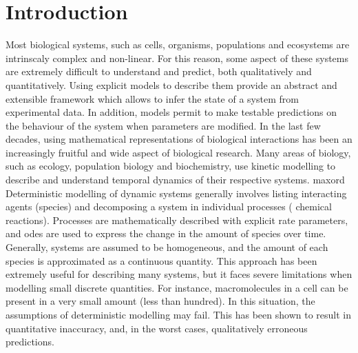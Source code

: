 \section{Introduction} \label{intro}

Most biological systems, such as cells, organisms, populations and ecosystems are intrinscaly complex and non-linear.
For this reason, some aspect of these systems are extremely difficult to understand and predict, both qualitatively and quantitatively\cite{klipp_systems_2013}.
Using explicit models to describe them provide an abstract and extensible framework which allows to infer the state of a system from experimental data.
In addition, models permit to make testable predictions on the behaviour of the system when parameters are modified.
In the last few decades, using mathematical representations of biological interactions has been an increasingly fruitful and wide aspect of biological research.
Many areas of biology, such as ecology, population biology and biochemistry,
use kinetic modelling to describe and understand temporal dynamics of their respective systems.
\gls{maxord}
Deterministic modelling of dynamic systems generally involves listing
interacting agents (species) and decomposing a system in individual processes (\eg{} chemical reactions).
Processes are mathematically described with explicit rate parameters, and \glspl{ode} are used to express the change in the amount of species over time.
Generally, systems are assumed to be homogeneous, and the amount of each species is approximated as a continuous quantity.
This approach has been extremely useful for describing many systems, but it faces severe limitations when modelling small discrete quantities.
For instance, macromolecules in a cell can be present in a very small amount (less than hundred)\cite{ghaemmaghami_global_2003}.
In this situation, the assumptions of deterministic modelling may fail.
This has been shown to result in quantitative inaccuracy\cite{ale_general_2013}, and, in the worst cases, qualitatively erroneous predictions.


